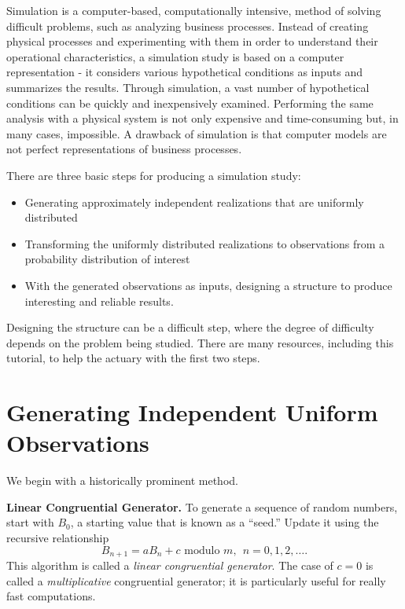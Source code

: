 \documentclass[]{book}
\theoremstyle{definition}
\theoremstyle{definition}
\theoremstyle{definition}
\theoremstyle{remark}
\begin{document}
Simulation is a computer-based, computationally intensive, method of
solving difficult problems, such as analyzing business processes.
Instead of creating physical processes and experimenting with them in
order to understand their operational characteristics, a simulation
study is based on a computer representation - it considers various
hypothetical conditions as inputs and summarizes the results. Through
simulation, a vast number of hypothetical conditions can be quickly and
inexpensively examined. Performing the same analysis with a physical
system is not only expensive and time-consuming but, in many cases,
impossible. A drawback of simulation is that computer models are not
perfect representations of business processes.

There are three basic steps for producing a simulation study:

\begin{itemize}
\item
  Generating approximately independent realizations that are uniformly
  distributed
\item
  Transforming the uniformly distributed realizations to observations
  from a probability distribution of interest
\item
  With the generated observations as inputs, designing a structure to
  produce interesting and reliable results.
\end{itemize}

Designing the structure can be a difficult step, where the degree of
difficulty depends on the problem being studied. There are many
resources, including this tutorial, to help the actuary with the first
two steps.

\section{Generating Independent Uniform
Observations}\label{generating-independent-uniform-observations}

We begin with a historically prominent method.

\textbf{Linear Congruential Generator.} To generate a sequence of random
numbers, start with \(B_0\), a starting value that is known as a
``seed.'' Update it using the recursive relationship
\[B_{n+1} = a B_n + c  \text{ modulo }m, ~~ n=0, 1, 2, \ldots .\] This
algorithm is called a \emph{linear congruential generator}. The case of
\(c=0\) is called a \emph{multiplicative} congruential generator; it is
particularly useful for really fast computations.
\end{document}

